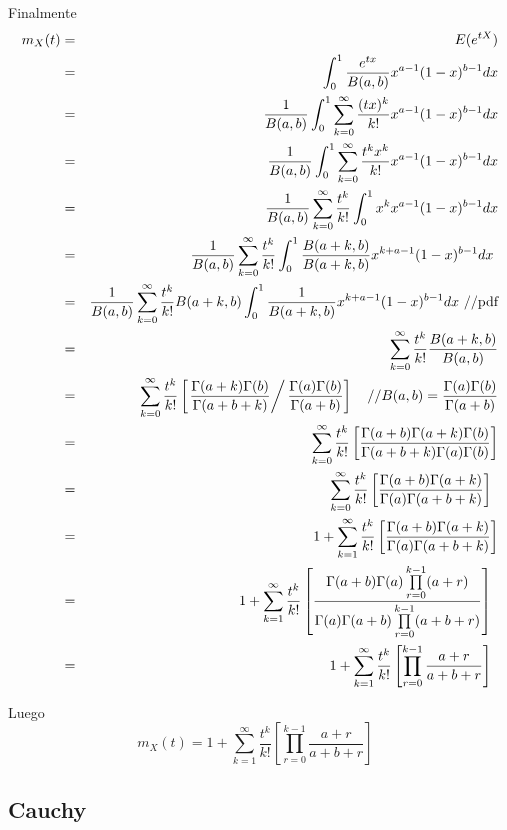 \begin{i}
Finalmente 
\begin{eqnarray*}
m_{X}(t) &=&E(e^{tX}) \\
&=&\int_{0}^{1}\frac{e^{tx}}{B(a,b)}x^{a-1}(1-x)^{b-1}dx \\
&=&\frac{1}{B(a,b)}\int_{0}^{1}\sum_{k=0}^{\infty }\frac{(tx)^{k}}{k!}%
x^{a-1}(1-x)^{b-1}dx \\
&=&\frac{1}{B(a,b)}\int_{0}^{1}\sum_{k=0}^{\infty }\frac{t^{k}x^{k}}{k!}%
x^{a-1}(1-x)^{b-1}dx \\
&=&\frac{1}{B(a,b)}\sum_{k=0}^{\infty }\frac{t^{k}}{k!}%
\int_{0}^{1}x^{k}x^{a-1}(1-x)^{b-1}dx \\
&=&\frac{1}{B(a,b)}\sum_{k=0}^{\infty }\frac{t^{k}}{k!}\int_{0}^{1}\frac{%
B(a+k,b)}{B(a+k,b)}x^{k+a-1}(1-x)^{b-1}dx\text{ } \\
&=&\frac{1}{B(a,b)}\sum_{k=0}^{\infty }\frac{t^{k}}{k!}B(a+k,b)\int_{0}^{1}%
\frac{1}{B(a+k,b)}x^{k+a-1}(1-x)^{b-1}dx\text{ //pdf} \\
&=&\sum_{k=0}^{\infty }\frac{t^{k}}{k!}\frac{B(a+k,b)}{B(a,b)} \\
&=&\sum_{k=0}^{\infty }\frac{t^{k}}{k!}\left[ \left. \frac{\Gamma
(a+k)\Gamma (b)}{\Gamma (a+b+k)}\right/ \frac{\Gamma (a)\Gamma (b)}{\Gamma
(a+b)}\right] \text{ \ \ //}B(a,b)=\frac{\Gamma (a)\Gamma (b)}{\Gamma (a+b)}
\\
&=&\sum_{k=0}^{\infty }\frac{t^{k}}{k!}\left[ \frac{\Gamma (a+b)\Gamma
(a+k)\Gamma (b)}{\Gamma (a+b+k)\Gamma (a)\Gamma (b)}\right] \\
&=&\sum_{k=0}^{\infty }\frac{t^{k}}{k!}\left[ \frac{\Gamma (a+b)\Gamma (a+k)%
}{\Gamma (a)\Gamma (a+b+k)}\right] \text{ } \\
&=&1+\sum_{k=1}^{\infty }\frac{t^{k}}{k!}\left[ \frac{\Gamma (a+b)\Gamma
(a+k)}{\Gamma (a)\Gamma (a+b+k)}\right] \\
&=&1+\sum_{k=1}^{\infty }\frac{t^{k}}{k!}\left[ \frac{\Gamma (a+b)\Gamma
(a)\prod\limits_{r=0}^{k-1}(a+r)}{\Gamma (a)\Gamma
(a+b)\prod\limits_{r=0}^{k-1}(a+b+r)}\right] \text{ } \\
&=&1+\sum_{k=1}^{\infty }\frac{t^{k}}{k!}\left[ \prod\limits_{r=0}^{k-1}%
\frac{a+r}{a+b+r}\right] \text{ }
\end{eqnarray*}

Luego
\begin{equation*}
m_{X}(t)=1+\sum_{k=1}^{\infty }\frac{t^{k}}{k!}\left[ \prod%
\limits_{r=0}^{k-1}\frac{a+r}{a+b+r}\right] \text{ }
\end{equation*}


\subsection{Cauchy}


\end{i}
